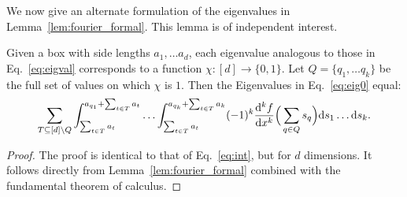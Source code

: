 We now give an alternate formulation of the eigenvalues in
Lemma~\ref{lem:fourier_formal}. This lemma is of independent interest.
\begin{lemma} \label{lem:box-int}
Given a box with side lengths $a_1, \ldots a_d$, each eigenvalue
analogous to those in Eq.~\eqref{eq:eigval} corresponds to a function
$\chi: [d] \rightarrow \{0, 1\}$.  Let $Q = \{q_1, \ldots q_k\}$ be the
full set of values on which $\chi$ is $1$.
Then the Eigenvalues in Eq.~\eqref{eq:eig0} equal:
\begin{align*}
  \sum_{T \subseteq [d] \setminus Q}
  \int_{\sum_{t \in T} a_t}^{a_{q_1}+\sum_{t \in T} a_t} \ldots
  \int_{\sum_{t \in T} a_t}^{a_{q_k}+\sum_{t \in T} a_k}
  (-1)^k\frac{\mathrm{d}^k f}{\mathrm{d} x^k} \Big( \sum_{q \in Q} s_q \Big) \mathrm{d} s_1 \ldots \mathrm{d} s_k.
\end{align*}
\end{lemma}
\begin{proof}
The proof is identical to that of Eq.~\eqref{eq:int}, but for $d$ dimensions. It follows directly from Lemma~\ref{lem:fourier_formal} combined with the fundamental theorem of calculus.
\end{proof} 
